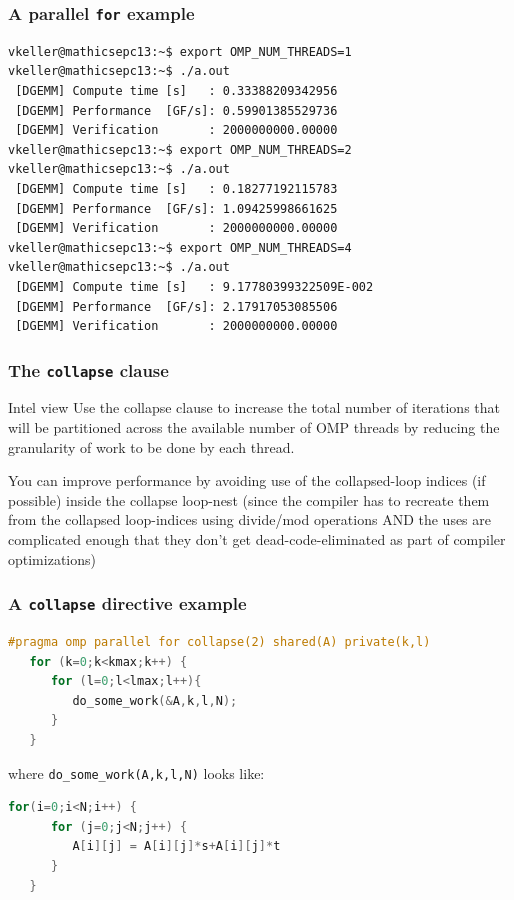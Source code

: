 \begin{frame}[containsverbatim]
\frametitle{A parallel \texttt{for} example}

\begin{verbatim}
vkeller@mathicsepc13:~$ export OMP_NUM_THREADS=1
vkeller@mathicsepc13:~$ ./a.out
 [DGEMM] Compute time [s]   : 0.33388209342956
 [DGEMM] Performance  [GF/s]: 0.59901385529736
 [DGEMM] Verification       : 2000000000.00000
vkeller@mathicsepc13:~$ export OMP_NUM_THREADS=2
vkeller@mathicsepc13:~$ ./a.out
 [DGEMM] Compute time [s]   : 0.18277192115783
 [DGEMM] Performance  [GF/s]: 1.09425998661625
 [DGEMM] Verification       : 2000000000.00000
vkeller@mathicsepc13:~$ export OMP_NUM_THREADS=4
vkeller@mathicsepc13:~$ ./a.out
 [DGEMM] Compute time [s]   : 9.17780399322509E-002
 [DGEMM] Performance  [GF/s]: 2.17917053085506
 [DGEMM] Verification       : 2000000000.00000
\end{verbatim}

\end{frame}




\begin{frame}
\frametitle{The \texttt{collapse} clause}

\begin{block}{Intel view}
Use the collapse clause to increase the total number of iterations that will be partitioned across the available number of OMP threads by reducing the granularity of work to be done by each thread.

You can improve performance by avoiding use of the collapsed-loop indices (if possible) inside the collapse loop-nest (since the compiler has to recreate them from the collapsed loop-indices using divide/mod operations AND the uses are complicated enough that they don't get dead-code-eliminated as part of compiler optimizations)
\end{block}

\end{frame}

\begin{frame}[containsverbatim]
\frametitle{A \texttt{collapse} directive example}

\begin{lstlisting}[language=C,frame=lines]
#pragma omp parallel for collapse(2) shared(A) private(k,l)
   for (k=0;k<kmax;k++) {
      for (l=0;l<lmax;l++){
         do_some_work(&A,k,l,N);
      }
   }
\end{lstlisting}
where \texttt{do\_some\_work(A,k,l,N)} looks like:
\begin{lstlisting}[language=C,frame=lines]
   for(i=0;i<N;i++) {
      for (j=0;j<N;j++) {
         A[i][j] = A[i][j]*s+A[i][j]*t
      }
   }
\end{lstlisting}
\end{frame}

